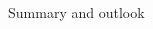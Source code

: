 \documentclass{ikpKoeln}
\begin{document}
\begin{frame}[t]{Summary and outlook}
\begin{columns}[c]
\begin{column}{0.45 \textwidth}
\begin{figure}
			\end{figure}
		\end{column}
	\end{columns}
\end{frame}



\end{document}
